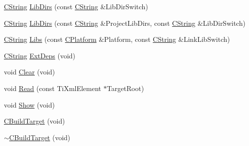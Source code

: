 \begin{DoxyCompactItemize}
\item 
\hyperlink{classCString}{C\-String} \hyperlink{classCBuildTarget_a5b0d1db0c9a71baf75948a1023e1ac3e}{Lib\-Dirs} (const \hyperlink{classCString}{C\-String} \&Lib\-Dir\-Switch)
\item 
\hyperlink{classCString}{C\-String} \hyperlink{classCBuildTarget_a9d8910a1f0d25902d91f1937e561dafd}{Lib\-Dirs} (const \hyperlink{classCString}{C\-String} \&Project\-Lib\-Dirs, const \hyperlink{classCString}{C\-String} \&Lib\-Dir\-Switch)
\item 
\hyperlink{classCString}{C\-String} \hyperlink{classCBuildTarget_ab8e4e6c34baedfe4880d73082e76d2cb}{Libs} (const \hyperlink{classCPlatform}{C\-Platform} \&Platform, const \hyperlink{classCString}{C\-String} \&Link\-Lib\-Switch)
\item 
\hyperlink{classCString}{C\-String} \hyperlink{classCBuildTarget_ac2d634a30fc74759b6b60db521850fe1}{Ext\-Deps} (void)
\item 
void \hyperlink{classCBuildTarget_a8a657acbe3b7114de59e98449ba8c98f}{Clear} (void)
\item 
void \hyperlink{classCBuildTarget_a202834e8685ab0be83aec5c76b326635}{Read} (const Ti\-Xml\-Element $\ast$Target\-Root)
\item 
void \hyperlink{classCBuildTarget_a57954e30f73ed40c0cac432e3d9e285b}{Show} (void)
\item 
\hyperlink{classCBuildTarget_a343f61a41744c3af9144da18302b8004}{C\-Build\-Target} (void)
\item 
\hyperlink{classCBuildTarget_a17c267cb329955e3a0832d931cbe2ffd}{$\sim$\-C\-Build\-Target} (void)
\end{DoxyCompactItemize}
